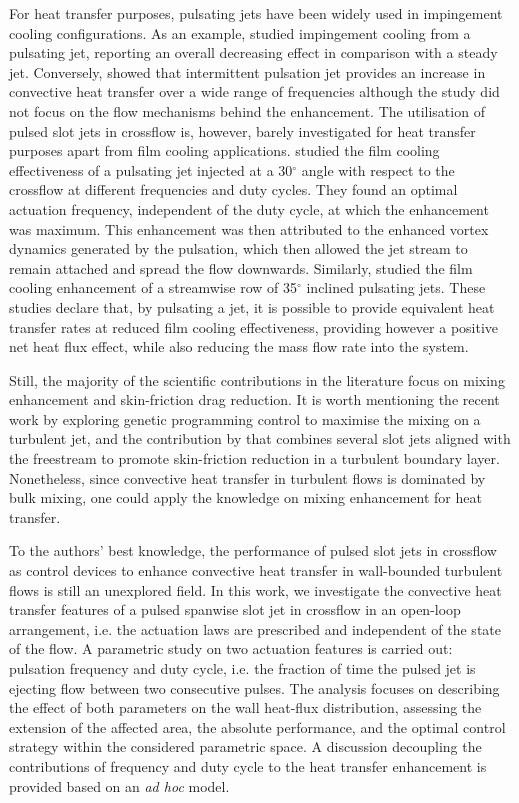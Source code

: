 For heat transfer purposes, pulsating jets have been widely used in impingement cooling configurations. As an example, \citet{azevedo1994pulsed} studied impingement cooling from a pulsating jet, reporting an overall decreasing effect in comparison with a steady jet. Conversely, \citet{xu2010turbulent} showed that intermittent pulsation jet provides an increase in convective heat transfer over a wide range of frequencies although the study did not focus on the flow mechanisms behind the enhancement. The utilisation of pulsed slot jets in crossflow is, however, barely investigated for heat transfer purposes apart from film cooling applications. \citet{muldoon2009dns} studied the film cooling effectiveness of a pulsating jet injected at a 30$^\circ$ angle with respect to the crossflow at different frequencies and duty cycles. They found an optimal actuation frequency, independent of the duty cycle, at which the enhancement was maximum. This enhancement was then attributed to the enhanced vortex dynamics generated by the pulsation, which then allowed the jet stream to remain attached and spread the flow downwards. Similarly, \citet{coulthard2007effect1, coulthard2007effect2} studied the film cooling enhancement of a streamwise row of 35$^\circ$ inclined pulsating jets. These studies declare that, by pulsating a jet, it is possible to provide equivalent heat transfer rates at reduced film cooling effectiveness, providing however a positive net heat flux effect, while also reducing the mass flow rate into the system.  

Still, the majority of the scientific contributions in the literature focus on mixing enhancement and skin-friction drag reduction. It is worth mentioning the recent work by \citet{zhou2020artificial} exploring genetic programming control to maximise the mixing on a turbulent jet, and the contribution by \citet{cheng2021skin} that combines several slot jets aligned with the freestream to promote skin-friction reduction in a turbulent boundary layer. 
Nonetheless, since convective heat transfer in turbulent flows is dominated by bulk mixing, one could apply the knowledge on mixing enhancement for heat transfer.

To the authors' best knowledge, the performance of pulsed slot jets in crossflow as control devices to enhance convective heat transfer in wall-bounded turbulent flows is still an unexplored field. In this work, we investigate the convective heat transfer features of a pulsed spanwise slot jet in crossflow in an open-loop arrangement, i.e. the actuation laws are prescribed and independent of the state of the flow. A parametric study on two actuation features is carried out: pulsation frequency and duty cycle, i.e. the fraction of time the pulsed jet is ejecting flow between two consecutive pulses. The analysis focuses on describing the effect of both parameters on the wall heat-flux distribution, assessing the extension of the affected area, the absolute performance, and the optimal control strategy within the considered parametric space. A discussion decoupling the contributions of frequency and duty cycle to the heat transfer enhancement is provided based on an \textit{ad hoc} model.

